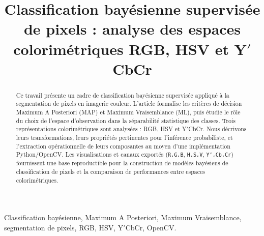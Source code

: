 \documentclass[conference]{IEEEtran}
\begin{document}
\title{Classification bay\'esienne supervis\'ee de pixels : analyse des espaces colorim\'etriques RGB, HSV et Y$'$CbCr}

\author{
    \and
    \and
}

\maketitle

\begin{abstract}
Ce travail pr\'esente un cadre de classification bay\'esienne supervis\'ee appliqu\'e \`a la segmentation de pixels en imagerie couleur. L'article formalise les crit\`eres de d\'ecision Maximum A Posteriori (MAP) et Maximum Vraisemblance (ML), puis \'etudie le r\^ole du choix de l'espace d'observation dans la s\'eparabilit\'e statistique des classes. Trois repr\'esentations colorim\'etriques sont analys\'ees : RGB, HSV et Y$'$CbCr. Nous d\'ecrivons leurs transformations, leurs propri\'et\'es pertinentes pour l'inf\'erence probabiliste, et l'extraction op\'erationnelle de leurs composantes au moyen d'une impl\'ementation Python/OpenCV. Les visualisations et canaux export\'es (\texttt{R,G,B}, \texttt{H,S,V}, \texttt{Y',Cb,Cr}) fournissent une base reproductible pour la construction de mod\`eles bay\'esiens de classification de pixels et la comparaison de performances entre espaces colorim\'etriques.
\end{abstract}

\begin{IEEEkeywords}
Classification bay\'esienne, Maximum A Posteriori, Maximum Vraisemblance, segmentation de pixels, RGB, HSV, Y$'$CbCr, OpenCV.
\end{IEEEkeywords}
\end{document}
